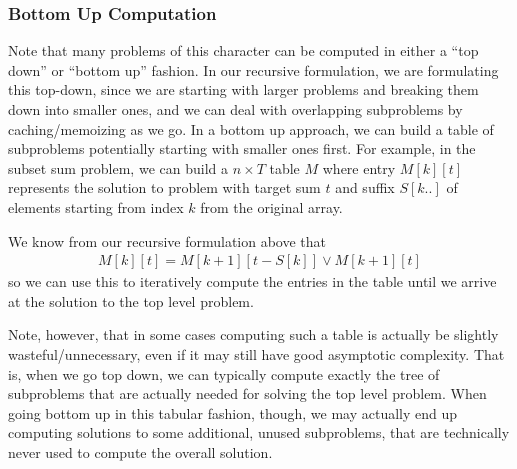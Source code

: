 \documentclass[10pt,a4paper]{article}
\begin{document}
\subsubsection*{Bottom Up Computation}

Note that many problems of this character can be computed in either a ``top down'' or ``bottom up'' fashion. In our recursive formulation, we are formulating this top-down, since we are starting with larger problems and breaking them down into smaller ones, and we can deal with overlapping subproblems by caching/memoizing as we go. In a bottom up approach, we can build a table of subproblems potentially starting with smaller ones first. For example, in the subset sum problem, we can build a $n \times T$ table $M$ where entry $M[k][t]$ represents the solution to problem with target sum $t$ and suffix $S[k..]$ of elements starting from index $k$ from the original array. 



We know from our recursive formulation above that
\begin{align*}
    M[k][t] = M[k+1][t-S[k]] \vee M[k+1][t]
\end{align*}
so we can use this to iteratively compute the entries in the table until we arrive at the solution to the top level problem. 

Note, however, that in some cases computing such a table is actually be slightly wasteful/unnecessary, even if it may still have good asymptotic complexity. That is, when we go top down, we can typically compute exactly the tree of subproblems that are actually needed for solving the top level problem. When going bottom up in this tabular fashion, though, we may actually end up computing solutions to some additional, unused subproblems, that are technically never used to compute the overall solution.
\end{document}
